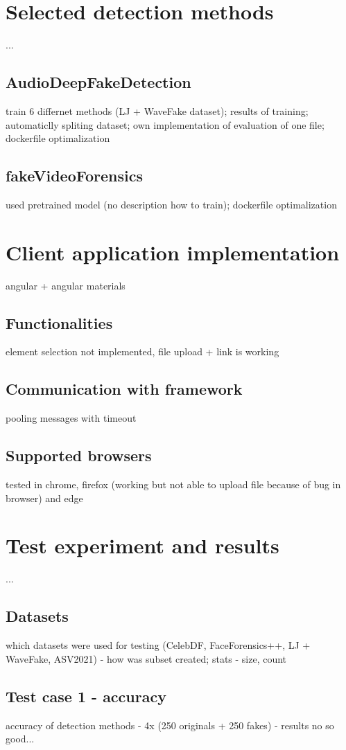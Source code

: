 \chapter{Selected detection methods}
...
\section{AudioDeepFakeDetection}
train 6 differnet methods (LJ + WaveFake dataset); results of training; automaticlly spliting dataset; own implementation of evaluation of one file; dockerfile optimalization
\section{fakeVideoForensics}
used pretrained model (no description how to train); dockerfile optimalization

\chapter{Client application implementation}
angular + angular materials
\section{Functionalities}
element selection not implemented, file upload + link is working 
\section{Communication with framework}
pooling messages with timeout
\section{Supported browsers}
tested in chrome, firefox (working but not able to upload file because of bug in browser) and edge

\chapter{Test experiment and results}
...
\section{Datasets}
which datasets were used for testing (CelebDF, FaceForensics++, LJ + WaveFake, ASV2021) - how was subset created; stats - size, count
\section{Test case 1 - accuracy}
accuracy of detection methods - 4x (250 originals + 250 fakes) - results no so good...
